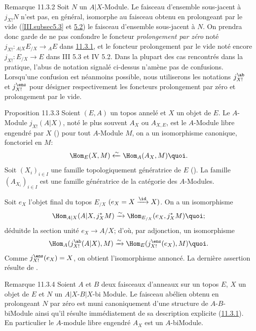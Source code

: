 \documentclass[10pt]{../fichiers-configuration-latex/smfart}
\begin{document}
\begin{enonce*}[remark]{Remarque 11.3.2}
Soit $N$ un $A| X$-Module. Le faisceau d'ensemble sous-jacent à
$j_{X!}N$ n'est pas, en général, isomorphe au faisceau obtenu en
prolongeant par le vide (\ref{III.subsec5.3} et \hyperref[IV.subsec5.2]{5.2}) le faisceau
d'ensemble sous-jacent à $N$. On prendra donc garde de ne pas
confondre le foncteur \emph{prolongement par zéro} noté
$j_{X!}:{}_{A|X}E_{/X}\rightarrow {}_{A}E$ dans \hyperref[IV.prop11.3.1]{11.3.1},
et le foncteur prolongement par le vide noté encore
$j_{X!}:E_{/X}\rightarrow E$ dans III 5.3 et IV 5.2. Dans la plupart
des cas rencontrés dans la pratique, l'abus de notation signalé
ci-dessus n'amène pas de confusions. Lorsqu'une confusion est
néanmoins possible, nous utiliserons les notations $j^{\ab}_{X!}$ et
$j^{\ens}_{X!}$ pour désigner respectivement les foncteurs
prolongement par zéro et prolongement par le vide.
\end{enonce*}

\begin{enonce*}{Proposition 11.3.3}
Soient $(E,A)$ un topos annelé et $X$ un objet de $E$. Le $A$-Module
$j_{X!}(A| X)$, noté le plus souvent $A_X$ ou $A_{X,E}$, est le
$A$-Module libre engendré par $X$ {\rm ()} \ie pour
tout $A$-Module $M$, on a un isomorphisme canonique, fonctoriel en
$M$:
$$
\Hom_E(X,M)\xleftarrow{\sim} \Hom_A (A_X, M){\quoi}.
$$
Soit $(X_i)_{i\in I}$ une famille topologiquement génératrice de $E$
{\rm ().} La famille $(A_{X_i})_{i\in I}$ est une
famille génératrice de la catégorie des $A$-Modules.
\end{enonce*}

Soit $e_X$ l'objet final du topos $E_{/X}$
$(e_X=X\xrightarrow{\id}X)$. On a un isomorphisme
$$
\Hom_{A| X}(A| X, j^{\ast}_X M)\xrightarrow{\sim} \Hom_{E_{/X}}(e_X,
j^{\ast}_X M){\quoi};
$$
déduit\pageoriginale de la section unité $e_X\rightarrow A/X$; d'où,
par adjonction, un isomorphisme
$$
\Hom_A(j^{\ab}_{X!}(A| X),
M)\xrightarrow{\sim}\Hom_E(j^{\ens}_{X!}(e_X),M){\quoi}.
$$
Comme $j^{\ens}_{X!}(e_X)=X$, on obtient l'isomorphisme annoncé. La
dernière assertion résulte de .

\begin{enonce*}[remark]{Remarque 11.3.4}
Soient $A$ et $B$ deux faisceaux d'anneaux sur un topos $E$, $X$ un
objet de $E$ et $N$ un $A|X$-$B| X$-bi Module. Le faisceau abélien
obtenu en prolongeant $N$ par zéro est muni canoniquement d'une
structure de $A$-$B$-biModule ainsi qu'il résulte immédiatement de
sa description explicite (\hyperref[IV.prop11.3.1]{11.3.1}). En particulier le
$A$-module libre engendré $A_X$ est un $A$-biModule.
\end{enonce*}
\end{document}
